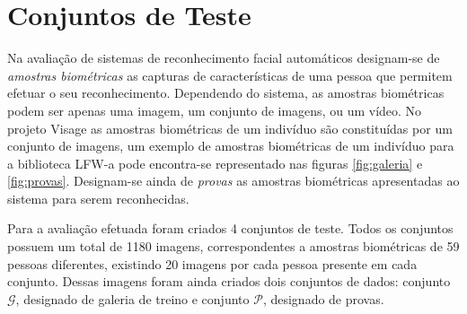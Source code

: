 \section{Conjuntos de Teste}  \label{sec:conjuntos}

Na avaliação de sistemas de reconhecimento facial automáticos designam-se de \textit{amostras biométricas} as capturas de características de uma pessoa que permitem efetuar o seu reconhecimento. Dependendo do sistema, as amostras biométricas podem ser apenas uma imagem, um conjunto de imagens, ou um vídeo. No projeto Visage as amostras biométricas de um indivíduo são constituídas por um conjunto de imagens, um exemplo de amostras biométricas de um indivíduo para a biblioteca LFW-a pode encontra-se representado nas figuras \ref{fig:galeria}  e \ref{fig:provas}. Designam-se ainda de \textit{provas} as amostras biométricas apresentadas ao sistema para serem reconhecidas.

Para a avaliação efetuada foram criados 4 conjuntos de teste. Todos os conjuntos possuem um total de 1180 imagens, correspondentes a amostras biométricas de 59 pessoas diferentes, existindo 20 imagens por cada pessoa presente em cada conjunto. Dessas imagens foram ainda criados dois conjuntos de dados: conjunto $\mathscr{G}$, designado de galeria de treino e conjunto $\mathscr{P}$, designado de provas.

